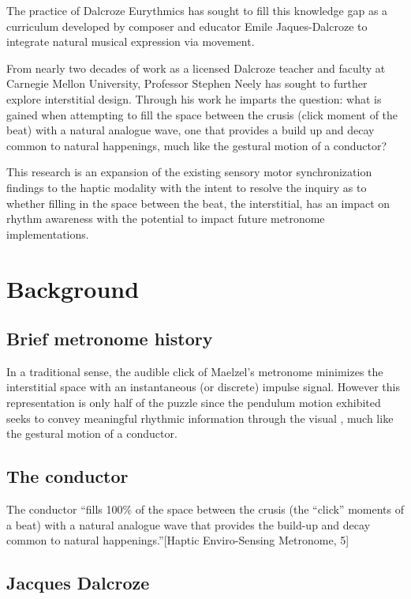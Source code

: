 The practice of Dalcroze Eurythmics has sought to fill this knowledge gap as a curriculum developed by composer and educator Emile Jaques-Dalcroze to integrate natural musical expression via movement.  

From nearly two decades of work as a licensed Dalcroze teacher and faculty at Carnegie Mellon University, Professor Stephen Neely has sought to further explore interstitial design. Through his work he imparts the question: what is gained when attempting to fill the space between the crusis (click moment of the beat) with a natural analogue wave, one that provides a build up and decay common to natural happenings, much like the gestural motion of a conductor?

This research is an expansion of the existing sensory motor synchronization findings to the haptic modality with the intent to resolve the inquiry as to whether filling in the space between the beat, the interstitial, has an impact on rhythm awareness with the potential to impact future metronome implementations. 

\section{Background}
\subsection{Brief metronome history}

In a traditional sense, the audible click of Maelzel's metronome minimizes the interstitial space with an instantaneous (or discrete) impulse signal. However this representation is only half of the puzzle since the pendulum motion exhibited seeks to convey meaningful rhythmic information through the visual , much like the gestural motion of a conductor.

\subsection{The conductor}

The conductor ``fills 100\% of the space between the crusis (the “click” moments of a beat) with a natural analogue wave that provides the build-up and decay common to natural happenings.''[Haptic Enviro-Sensing Metronome, 5]

\subsection{Jacques Dalcroze}

